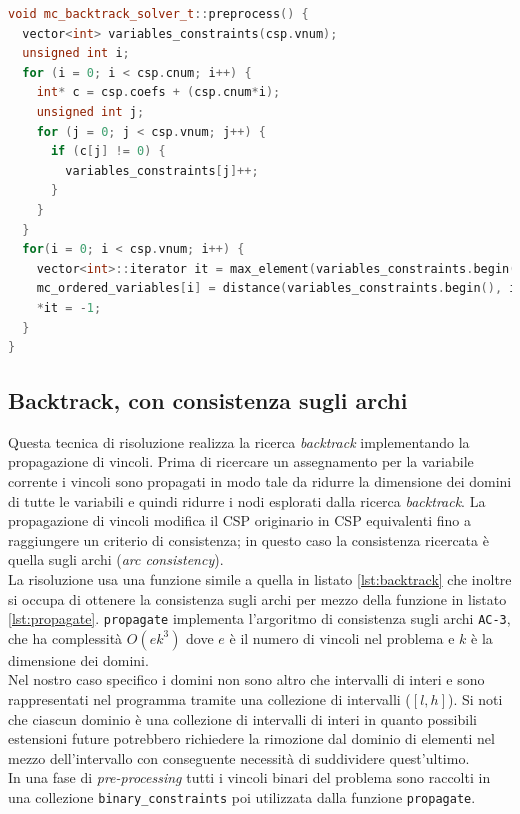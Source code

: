 \documentclass[10pt, a4paper]{article}
\begin{document}
\begin{lstlisting}[language=C++, caption=Funzione \texttt{preprocess} per la risoluzione \textit{backtrack}, label=lst:preprocess_mc]
void mc_backtrack_solver_t::preprocess() {
  vector<int> variables_constraints(csp.vnum);
  unsigned int i;
  for (i = 0; i < csp.cnum; i++) {
    int* c = csp.coefs + (csp.cnum*i);
    unsigned int j;
    for (j = 0; j < csp.vnum; j++) {
      if (c[j] != 0) {
        variables_constraints[j]++;
      }
    }
  }
  for(i = 0; i < csp.vnum; i++) {
    vector<int>::iterator it = max_element(variables_constraints.begin(), variables_constraints.end());
    mc_ordered_variables[i] = distance(variables_constraints.begin(), it);
    *it = -1;   
  }
}
\end{lstlisting}

\subsection{Backtrack, con consistenza sugli archi}
\label{sec:backtrack_ac}

Questa tecnica di risoluzione realizza la ricerca \textit{backtrack} implementando la propagazione di vincoli. Prima di ricercare un assegnamento per la variabile corrente i vincoli sono propagati in modo tale da ridurre la dimensione dei domini di tutte le variabili e quindi ridurre i nodi esplorati dalla ricerca \textit{backtrack}. La propagazione di vincoli modifica il CSP originario in CSP equivalenti fino a raggiungere un criterio di consistenza; in questo caso la consistenza ricercata è quella sugli archi (\textit{arc consistency}).\\
La risoluzione usa una funzione simile a quella in listato \ref{lst:backtrack} che inoltre si occupa di ottenere la consistenza sugli archi per mezzo della funzione in listato \ref{lst:propagate}. \texttt{propagate} implementa l'argoritmo di consistenza sugli archi \texttt{AC-3}, che ha complessità $O(ek^3)$ dove $e$ è il numero di vincoli nel problema e $k$ è la dimensione dei domini.\\
Nel nostro caso specifico i domini non sono altro che intervalli di interi e sono rappresentati nel programma tramite una collezione di intervalli ($\left [ l, h \right ]$). Si noti che ciascun dominio è una collezione di intervalli di interi in quanto possibili estensioni future potrebbero richiedere la rimozione dal dominio di elementi nel mezzo dell'intervallo con conseguente necessità di suddividere quest'ultimo.\\
In una fase di \textit{pre-processing} tutti i vincoli binari del problema sono raccolti in una collezione \texttt{binary\_constraints} poi utilizzata dalla funzione \texttt{propagate}.
\end{document}
